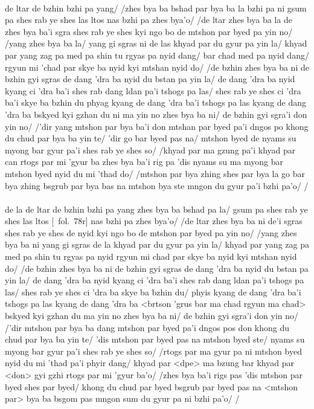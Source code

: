 \documentclass[12pt]{article}
\begin{document}
\textbf{\TVA}\\
de ltar de bzhin bzhi pa yang/ /zhes bya ba bshad par bya ba la bzhi pa ni gsum pa shes rab ye shes las ltos nas bzhi pa zhes bya'o/ /de ltar zhes bya ba la de zhes bya ba'i sgra shes rab ye shes kyi ngo bo de mtshon par byed pa yin no/ /yang zhes bya ba la/ yang gi sgras ni de las khyad par du gyur pa yin la/ khyad par yang zag pa med pa shin tu rgyas pa nyid dang/ bar chad med pa nyid dang/ rgyun mi 'chad par skye ba nyid kyi mtshan nyid do/ /de bzhin zhes bya ba ni de bzhin gyi sgras de dang 'dra ba nyid du bstan pa yin la/ de dang 'dra ba nyid kyang ci 'dra ba'i shes rab dang ldan pa'i tshogs pa las/ shes rab ye shes ci 'dra ba'i skye ba bzhin du phyag kyang de dang 'dra ba'i tshogs pa las kyang de dang 'dra ba bskyed kyi gzhan du ni ma yin no zhes bya ba ni/ de bzhin gyi sgra'i don yin no/ /'dir yang mtshon par bya ba'i don mtshan par byed pa'i dngos po khong du chud par bya ba yin te/ 'dir go bar byed pas na/ mtshon byed de nyams su myong bar gyur pa'i shes rab ye shes so/ /khyad par ma gzung pa'i khyad par can rtogs par mi 'gyur ba zhes bya ba'i rig pa 'dis nyams su ma myong bar mtshon byed nyid du mi 'thad do/ /mtshon par bya zhing shes par bya la go bar bya zhing bsgrub par bya bas na mtshon bya ste mngon du gyur pa'i bzhi pa'o/ /\\

\textbf{\TVB}\\
de la de ltar de bzhin bzhi pa yang zhes bya ba bshad pa la/ gsum pa shes rab ye shes las ltos [\TVB\ fol.\ 78r] nas bzhi pa zhes bya'o/ /de ltar zhes bya ba ni de'i sgras shes rab ye shes de nyid kyi ngo bo de mtshon par byed pa yin no/ /yang zhes bya ba ni yang gi sgras de la khyad par du gyur pa yin la/ khyad par yang zag pa med pa shin tu rgyas pa nyid rgyun mi chad par skye ba nyid kyi mtshan nyid do/ /de bzhin zhes bya ba ni de bzhin gyi sgras de dang 'dra ba nyid du bstan pa yin la/ de dang 'dra ba nyid kyang ci 'dra ba'i shes rab dang ldan pa'i tshogs pa las/ shes rab ye shes ci 'dra ba skye ba bzhin du/ phyis kyang de dang 'dra ba'i tshogs pa las kyang de dang 'dra ba <brtson 'grus bar ma chad rgyun ma chad> bskyed kyi gzhan du ma yin no zhes bya ba ni/ de bzhin gyi sgra'i don yin no/ /'dir mtshon par bya ba dang mtshon par byed pa'i dngos pos don khong du chud par bya ba yin te/ 'dis mtshon par byed pas na mtshon byed ste/ nyams su myong bar gyur pa'i shes rab ye shes so/ /rtogs par ma gyur pa ni mtshon byed nyid du mi 'thad pa'i phyir dang/ khyad par <dpe> ma bzung bar khyad par <don> gyi gzhi rtogs par mi 'gyur ba'o/ /zhes bya ba'i rigs pas 'dis mtshon par byed shes par byed/ khong du chud par byed bsgrub par byed pas na <mtshon par> bya ba bsgom pas mngon sum du gyur pa ni bzhi pa'o/ /\\
\end{document}
